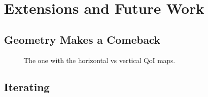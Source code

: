 \section{Extensions and Future Work}


\subsection{Geometry Makes a Comeback}

\begin{frame}[t]
\centering
\begin{figure}
\centering

The one with the horizontal vs vertical QoI maps.

\end{figure}

\end{frame}


\subsection{Iterating}

